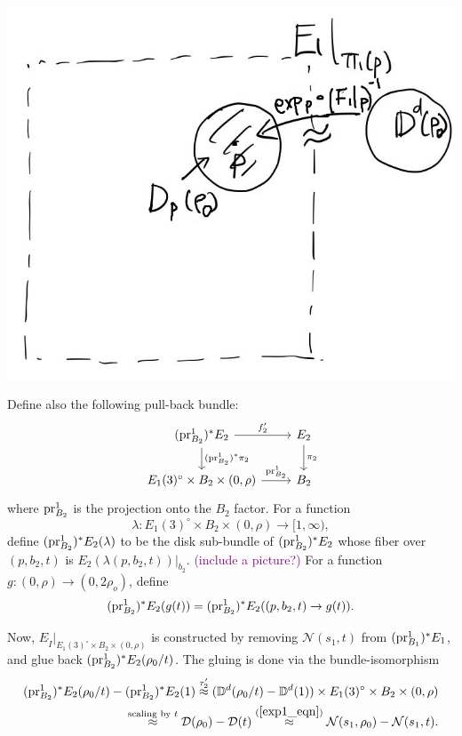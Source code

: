 \documentclass[11pt]{article}
\theoremstyle{definition}
\theoremstyle{remark}
\def\D{\mathbb{D}}
\def\cN{\mathcal{N}}
\def\rI{{\mathring{I}}}
\def\cmt#1{\textcolor{purple}{(#1)}}
\def\tn#1{\textnormal{#1}}
\def\pr{{\textnormal{pr}}}
\begin{document}
\includegraphics[scale=0.2]{fig3-1_fig}

Define also the following pull-back bundle:
\[\begin{tikzcd}
(\pr^1_{B_2})^*E_2\rar["f'_2"]\dar["(\pr^1_{B_2})^*\pi_2"] & E_2\dar["\pi_2"] \\
E_1(3)^\circ\times B_2\times (0,\rho)\rar["\pr^1_{B_2}"] & B_2
\end{tikzcd}\]
where $\pr^1_{B_2}$ is the projection onto the $B_2$ factor. 
For a function 
$$\lambda:E_1(3)^\circ\times B_2\times (0,\rho)\longrightarrow[1,\infty),$$ 
define $(\pr^1_{B_2})^*E_2(\lambda)$ to be the disk sub-bundle of $(\pr^1_{B_2})^*E_2$ whose fiber over $(p,b_2,t)$ is $E_2(\lambda(p,b_2,t))|_{b_2}$. 
\cmt{include a picture?} 
For a function $g:(0,\rho)\to(0,2\rho_o)$, define $$(\pr^1_{B_2})^*E_2(g(t))=(\pr^1_{B_2})^*E_2((p,b_2,t)\to g(t)).$$

Now, $E_\rI|_{E_1(3)^\circ\times B_2\times (0,\rho)}$ is constructed by removing $\cN(s_1,t)$ from $(\pr^1_{B_1})^*E_1$, and glue back $(\pr^1_{B_2})^*E_2(\rho_0/t)$. 
The gluing is done via the bundle-isomorphism
\begin{align}\label{filling_eqn}
(\pr^1_{B_2})^*E_2(\rho_0/t)-(\pr^1_{B_2})^*E_2(1)\stackrel{\tau'_2}{\approx}(\D^d(\rho_0/t)-\D^d(1))\times E_1(3)^\circ\times B_2\times(0,\rho) \nonumber\\
\stackrel{\tn{scaling by }t}{\approx}\mathcal{D}(\rho_0)-\mathcal{D}(t)\stackrel{(\ref{exp1_eqn})}{\approx}\cN(s_1,\rho_0)-\cN(s_1,t).
\end{align}
\end{document}
